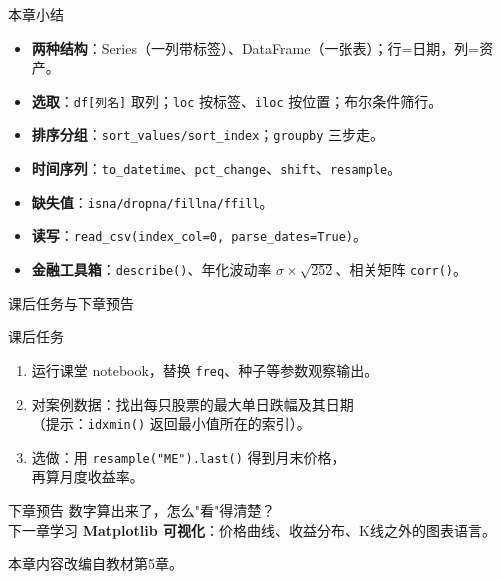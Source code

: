 \documentclass[9pt]{ctexbeamer}
\begin{document}
\begin{frame}{本章小结}
	\begin{itemize}
		\item \textbf{两种结构}：Series（一列带标签）、DataFrame（一张表）；\alert{行=日期，列=资产}。
		\item \textbf{选取}：\texttt{df[列名]} 取列；\texttt{loc} 按标签、\texttt{iloc} 按位置；布尔条件筛行。
		\item \textbf{排序分组}：\texttt{sort\_values/sort\_index}；\texttt{groupby} 三步走。
		\item \textbf{时间序列}：\texttt{to\_datetime}、\texttt{pct\_change}、\texttt{shift}、\texttt{resample}。
		\item \textbf{缺失值}：\texttt{isna/dropna/fillna/ffill}。
		\item \textbf{读写}：\texttt{read\_csv(index\_col=0, parse\_dates=True)}。
		\item \textbf{金融工具箱}：\texttt{describe()}、年化波动率 $\sigma\times\sqrt{252}$、相关矩阵 \texttt{corr()}。
	\end{itemize}
\end{frame}

\begin{frame}{课后任务与下章预告}
	\begin{block}{课后任务}
		\begin{enumerate}
			\item 运行课堂 notebook，替换 \texttt{freq}、种子等参数观察输出。
			\item 对案例数据：找出每只股票的最大单日跌幅及其日期\\
			（提示：\texttt{idxmin()} 返回最小值所在的索引）。
			\item 选做：用 \texttt{resample("ME").last()} 得到月末价格，\\
			再算月度收益率。
		\end{enumerate}
	\end{block}
	\begin{exampleblock}{下章预告}
		数字算出来了，怎么"看"得清楚？\\
		下一章学习 \textbf{Matplotlib 可视化}：价格曲线、收益分布、K线之外的图表语言。
	\end{exampleblock}
	\begin{center}
		\vspace{0.5em}
		本章内容改编自教材第5章\citep{hilpisch2018python}。
	\end{center}
\end{frame}
\end{document}
